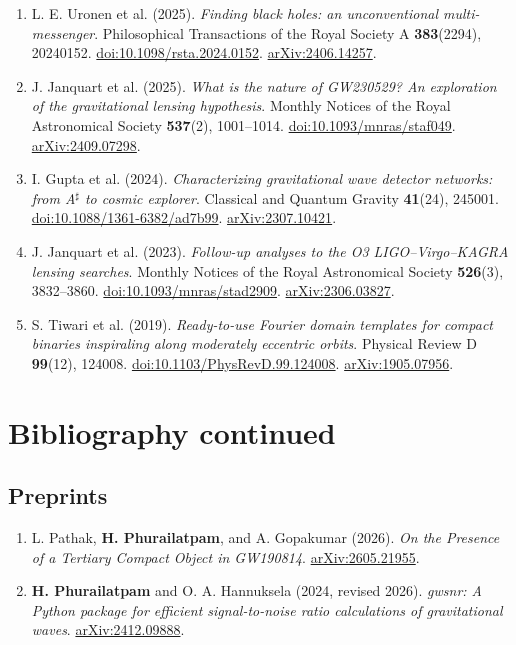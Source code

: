 \documentclass[11pt]{article}
\begin{document}
\begin{enumerate}
\item L. E. Uronen et al. (2025). \textit{Finding black holes: an unconventional multi-messenger}. Philosophical Transactions of the Royal Society A \textbf{383}(2294), 20240152. \href{https://doi.org/10.1098/rsta.2024.0152}{doi:10.1098/rsta.2024.0152}. \href{https://arxiv.org/abs/2406.14257}{arXiv:2406.14257}.

\item J. Janquart et al. (2025). \textit{What is the nature of GW230529? An exploration of the gravitational lensing hypothesis}. Monthly Notices of the Royal Astronomical Society \textbf{537}(2), 1001--1014. \href{https://doi.org/10.1093/mnras/staf049}{doi:10.1093/mnras/staf049}. \href{https://arxiv.org/abs/2409.07298}{arXiv:2409.07298}.

\item I. Gupta et al. (2024). \textit{Characterizing gravitational wave detector networks: from A$^\sharp$ to cosmic explorer}. Classical and Quantum Gravity \textbf{41}(24), 245001. \href{https://doi.org/10.1088/1361-6382/ad7b99}{doi:10.1088/1361-6382/ad7b99}. \href{https://arxiv.org/abs/2307.10421}{arXiv:2307.10421}.

\item J. Janquart et al. (2023). \textit{Follow-up analyses to the O3 LIGO--Virgo--KAGRA lensing searches}. Monthly Notices of the Royal Astronomical Society \textbf{526}(3), 3832--3860. \href{https://doi.org/10.1093/mnras/stad2909}{doi:10.1093/mnras/stad2909}. \href{https://arxiv.org/abs/2306.03827}{arXiv:2306.03827}.

\item S. Tiwari et al. (2019). \textit{Ready-to-use Fourier domain templates for compact binaries inspiraling along moderately eccentric orbits}. Physical Review D \textbf{99}(12), 124008. \href{https://doi.org/10.1103/PhysRevD.99.124008}{doi:10.1103/PhysRevD.99.124008}. \href{https://arxiv.org/abs/1905.07956}{arXiv:1905.07956}.
\end{enumerate}

\newpage
\section*{Bibliography continued}
\subsection*{Preprints}
\begin{enumerate}[start=11]
\item L. Pathak, \textbf{H. Phurailatpam}, and A. Gopakumar (2026). \textit{On the Presence of a Tertiary Compact Object in GW190814}. \href{https://arxiv.org/abs/2605.21955}{arXiv:2605.21955}.
\item \textbf{H. Phurailatpam} and O. A. Hannuksela (2024, revised 2026). \textit{gwsnr: A Python package for efficient signal-to-noise ratio calculations of gravitational waves}. \href{https://arxiv.org/abs/2412.09888}{arXiv:2412.09888}.
\end{enumerate}
\end{document}
